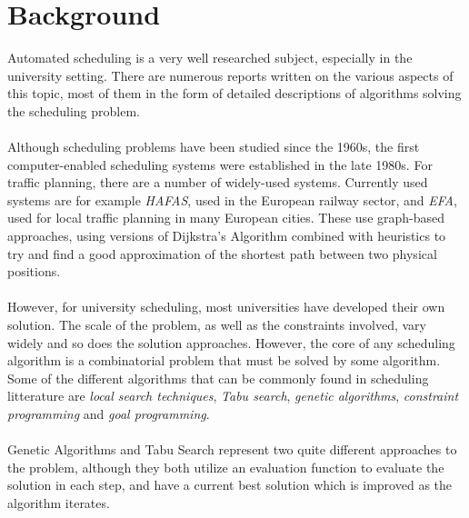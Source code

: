 \documentclass[titlepage,a4paper]{article}
\begin{document}
\section{Background}
Automated scheduling is a very well researched subject, especially in the university setting. There are numerous reports written on the various aspects of this topic, most of them in the form of detailed descriptions of algorithms solving the scheduling problem\cite{guidedSearch09}\cite{anApp05}.\\\\
Although scheduling problems have been studied since the 1960s\cite{efficient03}, the first computer-enabled scheduling systems were established in the late 1980s\cite{timeTableInfo06}. For traffic planning, there are a number of widely-used systems. Currently used systems are for example \emph{HAFAS}, used in the European railway sector, and \emph{EFA}, used for local traffic planning in many European cities. These use graph-based approaches, using versions of Dijkstra’s Algorithm combined with heuristics to try and find a good approximation of the shortest path between two physical positions\cite{timeTableInfo06}. \\\\
However, for university scheduling, most universities have developed their own solution\cite{efficient10}. The scale of the problem, as well as the constraints involved, vary widely and so does the solution approaches. However, the core of any scheduling algorithm is a combinatorial problem that must be solved by some algorithm. Some of the different algorithms that can be commonly found in scheduling litterature are \emph{local search techniques}, \emph{Tabu search}, \emph{genetic algorithms}, \emph{constraint programming} and \emph{goal programming}\cite{efficient03}. \\\\
Genetic Algorithms and Tabu Search represent two quite different approaches to the problem, although they both utilize an evaluation function to evaluate the solution in each step, and have a current best solution which is improved as the algorithm iterates.
\end{document}
